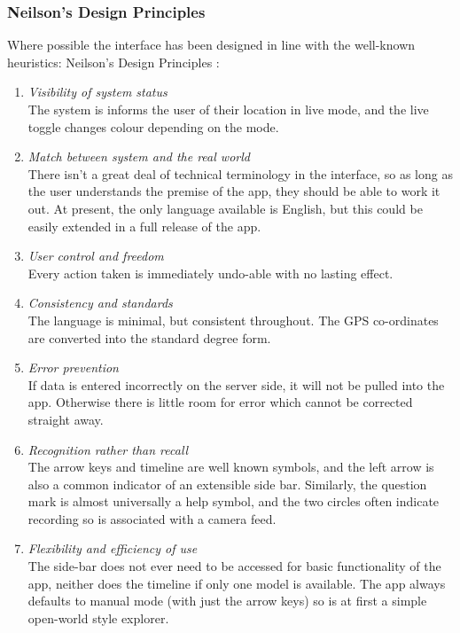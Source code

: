 \documentclass[12pt, a4paper]{article}
\begin{document}
\subsubsection{Neilson's Design Principles}
Where possible the interface has been designed in line with the well-known heuristics: Neilson's Design Principles \cite{design:neilsons}:

\begin{enumerate}
    \item \textit{Visibility of system status} \\
    The system is informs the user of their location in live mode, and the live toggle changes colour depending on the mode.
    \item \textit{Match between system and the real world} \\
    There isn't a great deal of technical terminology in the interface, so as long as the user understands the premise of the app, they should be able to work it out. At present, the only language available is English, but this could be easily extended in a full release of the app. 
    \item \textit{User control and freedom} \\
    Every action taken is immediately undo-able with no lasting effect.
    \item \textit{Consistency and standards} \\
    The language is minimal, but consistent throughout. The GPS co-ordinates are converted into the standard degree form.
    \item \textit{Error prevention} \\
    If data is entered incorrectly on the server side, it will not be pulled into the app. Otherwise there is little room for error which cannot be corrected straight away.
    \item \textit{Recognition rather than recall} \\
    The arrow keys and timeline are well known symbols, and the left arrow is also a common indicator of an extensible side bar. Similarly, the question mark is almost universally a help symbol, and the two circles often indicate recording so is associated with a camera feed.
    \item \textit{Flexibility and efficiency of use} \\
    The side-bar does not ever need to be accessed for basic functionality of the app, neither does the timeline if only one model is available. The app always defaults to manual mode (with just the arrow keys) so is at first a simple open-world style explorer.

\end{enumerate}
\end{document}
